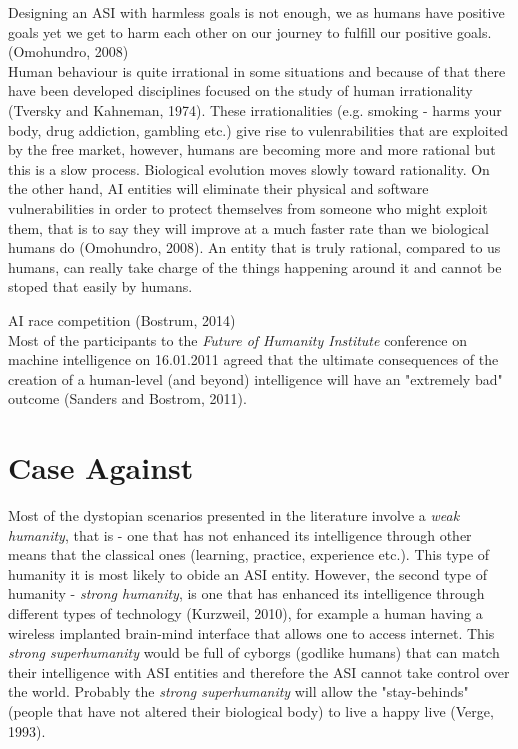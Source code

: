 \documentclass[11pt]{article}
\begin{document}
	Designing an ASI with harmless goals is not enough, we as humans have positive goals yet we get to harm each other on our journey to fulfill our positive goals. (Omohundro, 2008)\\

	Human behaviour is quite irrational in some situations and because of that there have been developed disciplines focused on the study of human irrationality (Tversky and Kahneman, 1974). These irrationalities (e.g. smoking - harms your body, drug addiction, gambling etc.) give rise to vulenrabilities that are exploited by the free market, however, humans are becoming more and more rational but this is a slow process. Biological evolution moves slowly toward rationality. On the other hand, AI entities will eliminate their physical  and software vulnerabilities in order to protect themselves from someone who might exploit them, that is to say they will  improve at a much faster rate than we biological humans do (Omohundro, 2008). An entity that is truly rational, compared to us humans, can really take charge of the things happening around it and cannot be stoped that easily by humans.
 
AI race competition (Bostrum, 2014) \\

	Most of the participants to the \textit{Future of Humanity Institute} conference on machine intelligence on 16.01.2011 agreed that the ultimate consequences of the creation of a human-level (and beyond) intelligence will have an "extremely bad" outcome (Sanders and Bostrom, 2011).



\section*{Case Against}
	Most of the dystopian scenarios presented in the literature involve a \textit{weak humanity}, that is - one that has not enhanced its intelligence through other means that the classical ones (learning, practice, experience etc.). This type of humanity it is most likely to obide an ASI entity. However, the second type of humanity - \textit{strong humanity}, is one that has enhanced its intelligence through different types of technology (Kurzweil, 2010), for example a human having a wireless implanted brain-mind interface that allows one to access internet. This \textit{strong superhumanity} would be full of cyborgs (godlike humans) that can match their intelligence with ASI entities and therefore the ASI cannot take control over the world. Probably the \textit{strong superhumanity} will allow the  "stay-behinds" (people that have not altered their biological body) to live a happy live (Verge, 1993). \\
\end{document}
